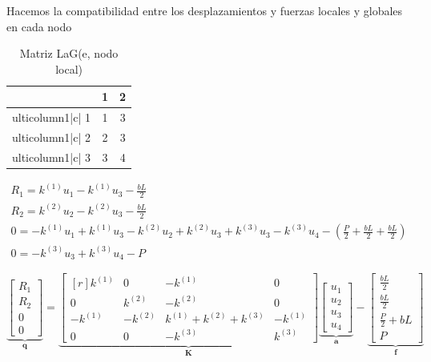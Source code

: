\documentclass[12pt,letterpaper]{article}
\begin{document}
Hacemos la compatibilidad entre los desplazamientos y fuerzas locales y globales en cada nodo

\begin{table}[h]
	\centering
	\begin{tabular}{c|c|c|}
		\cline{2-3}
		& {\color[HTML]{3166FF} 1} & {\color[HTML]{3166FF} 2} \\ \hline
		ulticolumn{1}{|c|}{{\color[HTML]{3166FF} 1}} & 1                        & 3                        \\ \hline
		ulticolumn{1}{|c|}{{\color[HTML]{3166FF} 2}} & 2                        & 3                        \\ \hline
		ulticolumn{1}{|c|}{{\color[HTML]{3166FF} 3}} & 3                        & 4                        \\ \hline
	\end{tabular}
	\caption{Matriz LaG(e, nodo local)}
	\label{tab:LaG}
\end{table}

\begin{align}
R_1= k^{(1)} u_1 - k^{(1)} u_3 - \frac{bL}{2}\\
R_2= k^{(2)} u_2 - k^{(2)} u_3 - \frac{bL}{2}\\
0  =- k^{(1)} u_1 + k^{(1)} u_3 - k^{(2)} u_2 + k^{(2)} u_3 + k^{(3)} u_3 - k^{(3)} u_4 - \left( \frac{P}{2} + \frac{bL}{2} + \frac{bL}{2} \right)\\
0  =- k^{(3)} u_3 + k^{(3)} u_4 - P
\end{align}


\[
\underbrace{\begin{bmatrix}
		R_1\\ 
		R_2\\ 
		0\\ 
		0
\end{bmatrix}}_{ \mathbf{q}}
=
\underbrace{\begin{bmatrix*}[r]
		k^{(1)} & 0 & -k^{(1)} & 0\\ 
		0 & k^{(2)} & -k^{(2)} & 0\\ 
		-k^{(1)} & -k^{(2)} &  k^{(1)}+k^{(2)}+k^{(3)} & -k^{(1)}\\ 
		0 & 0 & -k^{(3)} & k^{(3)}
\end{bmatrix*}}_{ \mathbf{K}}
\underbrace{\begin{bmatrix}
		u_1\\ 
		u_2\\ 
		u_3\\ 
		u_4
\end{bmatrix}}_{ \mathbf{a} }
-
\underbrace{\begin{bmatrix}
		\frac{bL}{2}\\ 
		\frac{bL}{2}\\ 
		\frac{P}{2} + bL\\ 
		P
\end{bmatrix}}_{ \mathbf{f} }
\]
\end{document}
